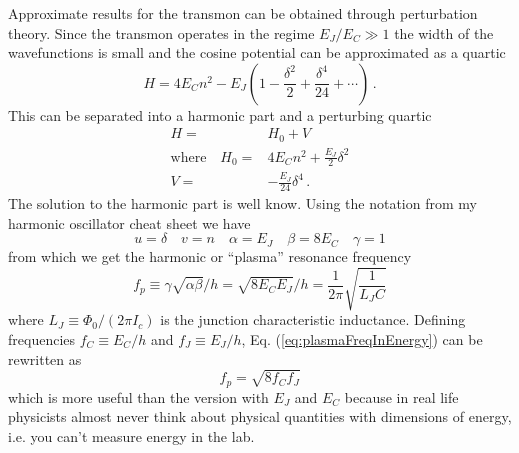 \documentclass[twocolumn]{article}
\begin{document}
Approximate results for the transmon can be obtained through perturbation theory.
Since the transmon operates in the regime $E_J/E_C \gg 1$ the width of the wavefunctions is small and the cosine potential can be approximated as a quartic
\begin{equation}
H = 4E_C n^2 - E_J \left(1 - \frac{\delta^2}{2} + \frac{\delta^4}{24} + \cdots \right) \, .
\end{equation}
This can be separated into a harmonic part and a perturbing quartic
\begin{align}
H =& H_0 + V \\
\textrm{where} \quad H_0  =& 4E_C n^2 + \frac{E_J}{2} \delta^2 \\
V =& -\frac{E_J}{24} \delta^ 4 \, .
\end{align}
The solution to the harmonic part is well know.
Using the notation from my harmonic oscillator cheat sheet we have \begin{equation}
u = \delta \quad v = n \quad \alpha = E_J \quad \beta = 8E_C \quad \gamma = 1 \end{equation}
from which we get the harmonic or ``plasma'' resonance frequency
\begin{equation}
f_p \equiv \gamma \sqrt{\alpha \beta}/h = \sqrt{8 E_C E_J}/h = \frac{1}{2\pi} \sqrt{\frac{1}{L_J C}} \label{eq:plasmaFreqInEnergy}
\end{equation}
where $L_J \equiv \Phi_0 / (2\pi I_c)$ is the junction characteristic inductance.
Defining frequencies $f_C \equiv E_C/h$ and $f_J \equiv E_J/h$, Eq. (\ref{eq:plasmaFreqInEnergy}) can be rewritten as
\begin{equation}
f_p = \sqrt{8 f_C f_J} \label{eq:plasmaFrequency}
\end{equation}
which is more useful than the version with $E_J$ and $E_C$ because in real life physicists almost never think about physical quantities with dimensions of energy, i.e. you can't measure energy in the lab.
\end{document}
